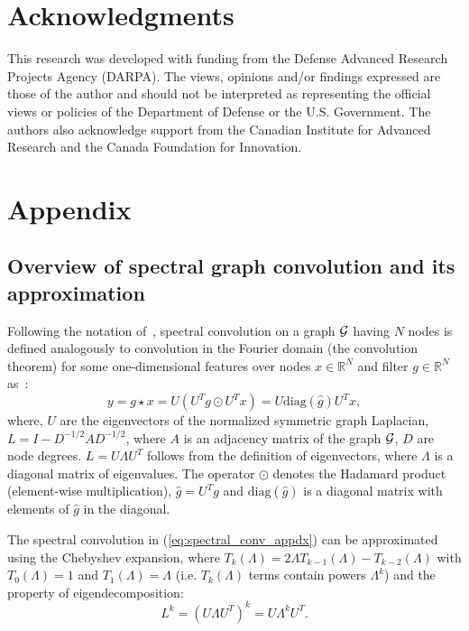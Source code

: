 \documentclass[final,nonatbib]{article} \usepackage{nips_2018}
\begin{document}
	\section*{Acknowledgments}
	This research was developed with funding from the Defense Advanced Research Projects Agency (DARPA). The views, opinions and/or findings expressed are those of the author and should not be interpreted as representing the official views or policies of the Department of Defense or the U.S. Government.
	The authors also acknowledge support from the Canadian Institute for Advanced Research and the Canada Foundation for Innovation.

	
	
	\vfill

	\pagebreak
	\vfill

	\section*{Appendix}


	\subsection{Overview of spectral graph convolution and its approximation}
	\label{sec:spectral_graph_conv_details}

	Following the notation of~\cite{defferrard2016convolutional}, spectral convolution on a graph $\cal G$ having $N$ nodes is defined analogously to convolution in the Fourier domain (the convolution theorem) for some one-dimensional features over nodes $x \in \mathbb{R}^{N}$ and filter $g \in \mathbb{R}^N$ as~\cite{bruna2013spectral,bronstein2017geometric}:
\begin{equation}
	\label{eq:spectral_conv_appdx}
	y = g \star x = U (U^Tg \odot U^Tx) = U \text{diag}(\hat{g}) U^Tx,
	\end{equation}
where, $U$ are the eigenvectors of the normalized symmetric graph Laplacian, $L = I - D^{-1/2}AD^{-1/2}$, where $A$ is an adjacency matrix of the graph $\cal G$, $D$ are node degrees.
	$L=U \Lambda U^T$ follows from the definition of eigenvectors, where $\Lambda$ is a diagonal matrix of eigenvalues. The operator $\odot$ denotes the Hadamard product (element-wise multiplication), $\hat{g} = U^Tg$ and $\text{diag}(\hat{g})$ is a diagonal matrix with elements of $\hat{g}$ in the diagonal.

	The spectral convolution in (\ref{eq:spectral_conv_appdx}) can be approximated using the Chebyshev expansion, where $T_k(\Lambda) = 2 \Lambda T_{k-1}(\Lambda) - T_{k-2}(\Lambda)$ with $T_0(\Lambda) = 1$ and $T_1(\Lambda) = \Lambda$ (i.e. $T_k(\Lambda)$ terms contain powers $\Lambda^k$) and the property of eigendecomposition:
\begin{equation}
	\label{eq:eigen_property_power_appdx}
	L^k=(U \Lambda U^T)^k = U \Lambda^k U^T.
	\end{equation}
\end{document}
